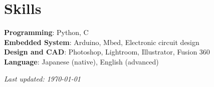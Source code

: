 \documentclass[letterpaper,11pt]{article}
\begin{document}
\section{Skills}
\small{
    \textbf{Programming}: Python, {C\nolinebreak[4]\hspace{-.05em}\raisebox{.4ex}{\tiny\bf ++}} \\
    \textbf{Embedded System}: Arduino, Mbed, Electronic circuit design \\
    \textbf{Design and CAD}: Photoshop, Lightroom, Illustrator, Fusion 360 \\
    \textbf{Language}: Japanese (native), English (advanced)
}


\vspace{5pt}
\begin{flushright}
    {\small\textit{Last updated: \today}}
\end{flushright}
\end{document}
